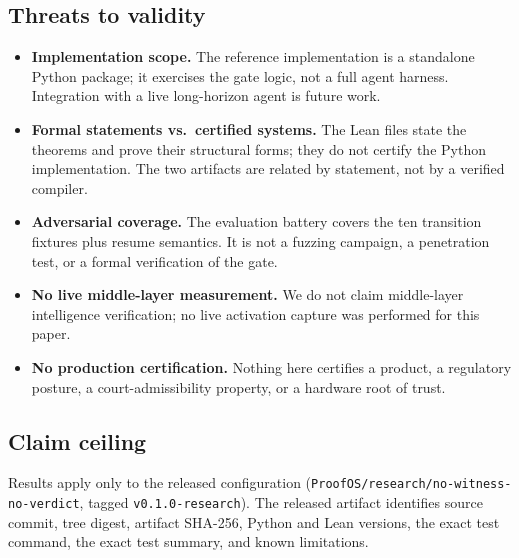 \subsection{Threats to validity}

\begin{itemize}
  \item \textbf{Implementation scope.} The reference implementation is a
  standalone Python package; it exercises the gate logic, not a full agent
  harness. Integration with a live long-horizon agent is future work.
  \item \textbf{Formal statements vs.\ certified systems.} The Lean files
  state the theorems and prove their structural forms; they do not certify
  the Python implementation. The two artifacts are related by statement,
  not by a verified compiler.
  \item \textbf{Adversarial coverage.} The evaluation battery covers the
  ten transition fixtures plus resume semantics. It is not a fuzzing
  campaign, a penetration test, or a formal verification of the gate.
  \item \textbf{No live middle-layer measurement.} We do not claim
  middle-layer intelligence verification; no live activation capture was
  performed for this paper.
  \item \textbf{No production certification.} Nothing here certifies a
  product, a regulatory posture, a court-admissibility property, or a
  hardware root of trust.
\end{itemize}

\subsection{Claim ceiling}

\begin{center}
\end{center}

Results apply only to the released configuration
(\texttt{ProofOS/research/no-witness-no-verdict}, tagged
\texttt{v0.1.0-research}). The released artifact identifies source commit,
tree digest, artifact SHA-256, Python and Lean versions, the exact test
command, the exact test summary, and known limitations.
